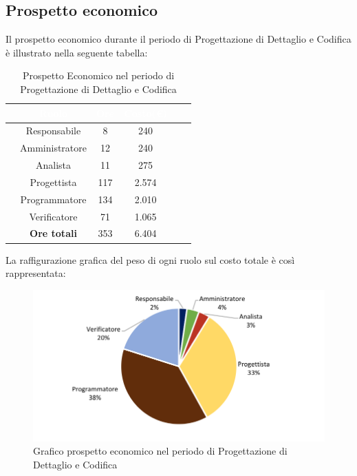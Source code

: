 \subsection{Prospetto economico}
Il prospetto economico durante il periodo di Progettazione di Dettaglio e Codifica è illustrato nella seguente tabella:

\begin{table}[ht]
	\begin{center}
		\begin{tabular}{cccccc}
			\rowcolor{coolblack}
			\hline
			&\textcolor{white}{Ruolo}&	\textcolor{white}{Ore} &\textcolor{white}{Costo(\euro)} \\
			\hline
			&Responsabile           &8&240\\
			&Amministratore        & 12& 240 \\
			&Analista                   & 11& 275 \\
			&Progettista              &  117& 2.574\\
			&Programmatore       & 134& 2.010 \\
			&Verificatore             & 71& 1.065 \\
			\hline
			&\textbf{Ore totali}    &353&6.404\\
		\end{tabular}
		\caption{Prospetto Economico nel periodo di Progettazione di Dettaglio e Codifica}
	\end{center}
\end{table}

La raffigurazione grafica del peso di ogni ruolo sul costo totale è così rappresentata:

\begin{figure}[!ht]
	\begin{center}
		\includegraphics{images/grafoProgettazioneDettaglioCodificaEuro.png}
		\caption{Grafico prospetto economico nel periodo di Progettazione di Dettaglio e Codifica}
	\end{center}
\end{figure}

